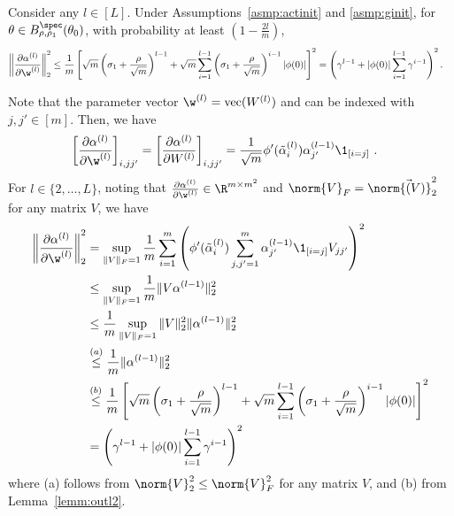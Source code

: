\begin{lemm}
Consider any $l\in[L]$. 
Under Assumptions~\ref{asmp:actinit} and \ref{asmp:ginit}, for $\theta \in B_{\rho,\rho_1}^{\spec}(\theta_0)$, with probability at least $\left(1-\frac{2l}{m}\right)$,
\begin{equation}
\begin{split}
\left\| \frac{\partial \alpha^{(l)}}{\partial \w^{(l)}} \right\|_2^2  &  \leq \frac{1}{m} \left[ \sqrt{m} \left(\sigma_1 + \frac{\rho}{\sqrt{m}} \right)^{l-1} + \sqrt{m} \sum_{i=1}^{l-1}  \left(\sigma_1 + \frac{\rho}{\sqrt{m}} \right)^{i-1} |\phi(0)| \right]^2  = \left( \gamma^{l-1} + |\phi(0)| \sum_{i=1}^{l-1} \gamma^{i-1}\right)^2.
\end{split}
\end{equation}    
\label{lem:alpha_W}
\end{lemm}
\proof
%
%
Note that the parameter vector $\w^{(l)} = \text{vec}(W^{(l)})$ and can be indexed with $j,j'\in[m]$. Then, we have
\begin{align}
 \left[ \frac{\partial \alpha^{(l)}}{\partial \w^{(l)}} \right]_{i,jj'} & = \left[ \frac{\partial \alpha^{(l)}}{\partial W^{(l)}} \right]_{i,jj'} = \frac{1}{\sqrt{m}} \phi'(\tilde{\alpha}^{(l)}_i) \alpha^{(l-1)}_{j'} \1_{[i=j]}~.
 \label{eq:d_alpha_d_w}
\end{align}
For $l\in\{2,\dots,L\}$, noting that $\frac{\partial \alpha^{(l)}}{\partial \w^{(l)}} \in \R^{m \times m^2}$ and $\norm{V}_F=\norm{\vec(V)}^2_2$ for any matrix $V$, we have 
\begin{align*}
\left\| \frac{\partial \alpha^{(l)}}{\partial \w^{(l)}} \right\|_2^2  & = \sup_{\| V \|_F =1} \frac{1}{m} \sum_{i=1}^m  \left( \phi'(\tilde{\alpha}_i^{(l)} ) \sum^m_{j,j'=1}\alpha^{(l-1)}_{j'} \1_{[i=j]} V_{jj'} \right)^2 \\
& \leq  \sup_{\| V \|_F =1} \frac{1}{m} \| V \alpha^{(l-1)} \|_2^2 \\
& \leq \frac{1}{m} \sup_{\| V \|_F =1} \| V \|_2^2 \| \alpha^{(l-1)} \|_2^2 \\
& \overset{(a)}{\leq} \frac{1}{m}  \| \alpha^{(l-1)} \|_2^2 \\
& \overset{(b)}{\leq} \frac{1}{m} \left[ \sqrt{m} \left(\sigma_1 + \frac{\rho}{\sqrt{m}} \right)^{l-1} + \sqrt{m} \sum_{i=1}^{l-1}  \left(\sigma_1 + \frac{\rho}{\sqrt{m}} \right)^{i-1} |\phi(0)| \right]^2  \\
& = \left( \gamma^{l-1} +  |\phi(0)| \sum_{i=1}^{l-1} \gamma^{i-1} \right)^2
\end{align*}
where (a) follows from $\norm{V}_2^2\leq\norm{V}_F^2$ for any matrix $V$, and (b) from Lemma~\ref{lemm:outl2}.

